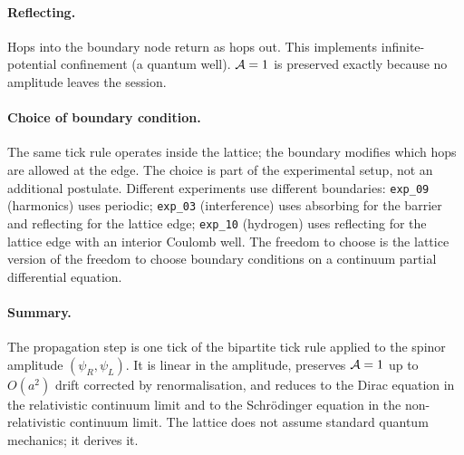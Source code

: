 \paragraph{Reflecting.}
Hops into the boundary node return as hops out. This implements
infinite-potential confinement (a quantum well). $\mathcal{A}=1$ is
preserved exactly because no amplitude leaves the session.

\paragraph{Choice of boundary condition.}
The same tick rule operates inside the lattice; the boundary modifies
which hops are allowed at the edge. The choice is part of the
experimental setup, not an additional postulate. Different
experiments use different boundaries: \texttt{exp\_09} (harmonics)
uses periodic; \texttt{exp\_03} (interference) uses absorbing for the
barrier and reflecting for the lattice edge; \texttt{exp\_10}
(hydrogen) uses reflecting for the lattice edge with an interior
Coulomb well. The freedom to choose is the lattice version of the
freedom to choose boundary conditions on a continuum partial
differential equation.

\paragraph{Summary.}
The propagation step is one tick of the bipartite tick rule applied
to the spinor amplitude $(\psi_R, \psi_L)$. It is linear in the
amplitude, preserves $\mathcal{A}=1$ up to $O(a^2)$ drift corrected by
renormalisation, and reduces to the Dirac equation in the
relativistic continuum limit and to the Schr\"odinger equation in the
non-relativistic continuum limit. The lattice does not assume
standard quantum mechanics; it derives it.
